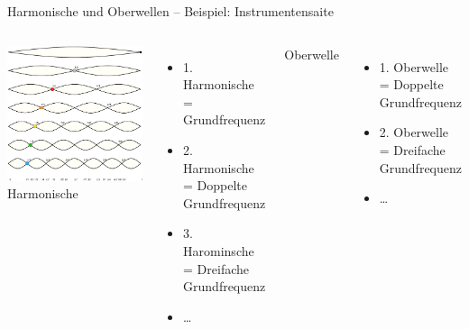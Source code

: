 \begin{frame}{Harmonische und Oberwellen -- Beispiel: Instrumentensaite}
  \begin{columns}[c]
    \includegraphics[width=\textwidth,height=\textheight,keepaspectratio]{a11/Moodswingerscale.pdf}
    {\tiny \hyperlink{refs}{\cite{wm}}}
    Harmonische
    \begin{itemize}
      \item 1. Harmonische = Grundfrequenz
      \item 2. Harmonische = Doppelte Grundfrequenz
      \item 3. Harominsche = Dreifache Grundfrequenz
      \item \ldots
    \end{itemize}
    Oberwelle
    \begin{itemize}
      \item 1. Oberwelle = Doppelte Grundfrequenz
      \item 2. Oberwelle = Dreifache Grundfrequenz
      \item \ldots
    \end{itemize}
  \end{columns}
\end{frame}

